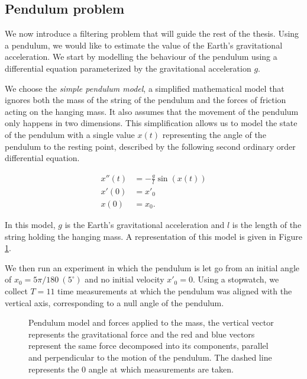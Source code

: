 \subsection{Pendulum problem}

We now introduce a filtering problem that will guide the rest of the thesis. Using a pendulum, we would like to estimate the value of the Earth's gravitational acceleration. We start by modelling the behaviour of the pendulum using a differential equation parameterized by the gravitational acceleration $g$.

We choose the \textit{simple pendulum model}, a simplified mathematical model that ignores both the mass of the string of the pendulum and the forces of friction acting on the hanging mass. It also assumes that the movement of the pendulum only happens in two dimensions. This simplification allows us to model the state of the pendulum with a single value $x(t)$ representing the angle of the pendulum to the resting point, described by the following second ordinary order differential equation.

\begin{equation}\label{pendulum-ode}
  \begin{aligned}
  x''(t) &= -\frac{g}{l}\sin(x(t))\\
  x'(0) &= x'_0\\
  x(0) &= x_0.
  \end{aligned}
\end{equation}

In this model, $g$ is the Earth's gravitational acceleration and $l$ is the length of the string holding the hanging mass. A representation of this model is given in Figure \ref{pendulum-fig}.

We then run an experiment in which the pendulum is let go from an initial angle of $x_0 = 5\pi/180\ (5^\circ)$ and no initial velocity $x'_0 = 0$. Using a stopwatch, we collect $T=11$ time measurements at which the pendulum was aligned with the vertical axis, corresponding to a null angle of the pendulum.

\begin{figure}
  \centering
  
  \caption{Pendulum model and forces applied to the mass, the vertical vector represents the gravitational force and the red and blue vectors represent the same force decomposed into its components, parallel and perpendicular to the motion of the pendulum. The dashed line represents the $0$ angle at which measurements are taken.}
  \label{pendulum-fig}
\end{figure}

